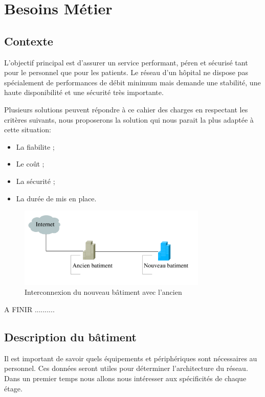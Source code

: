 \section{Besoins Métier}

%
%
\subsection{Contexte}

L’objectif principal est d’assurer un service performant, péren et sécurisé tant pour le personnel que pour les patients.
Le réseau d'un hôpital ne dispose pas spécialement de performances de débit minimum mais demande une stabilité, une haute disponibilité et une sécurité très importante.

Plusieurs solutions peuvent répondre à ce cahier des charges en respectant les critères suivants, nous proposerons la solution qui nous parait la plus adaptée à cette situation:
\begin{itemize}
\item La fiabilite ;
\item Le coût ;
\item La sécurité ;
\item La durée de mis en place.
\end{itemize}


\begin{figure}[!ht]
    \center
    \includegraphics[width=0.8\textwidth]{./images/interco-batiment.png}
    \caption{Interconnexion du nouveau bâtiment avec l'ancien}
\end{figure}


A FINIR ..........

%
%
\subsection{Description du bâtiment}

Il est important de savoir quels équipements et périphériques sont nécessaires au personnel.
Ces données seront utiles pour déterminer l'architecture du réseau.
Dans un premier temps nous allons nous intéresser aux spécificités de chaque étage.

